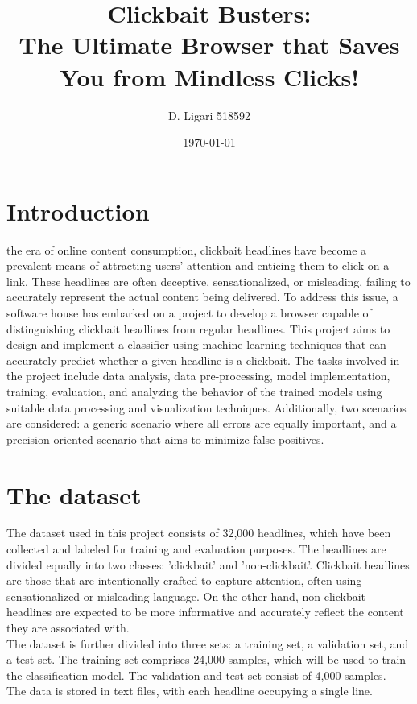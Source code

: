 \documentclass{class}
\title{Clickbait Busters:\\ The Ultimate Browser that Saves You from Mindless Clicks!}
\author[1]{D. Ligari 518592}
\affil[1]{Machine Learning course, University of Pavia, Department of Computer Engineering (Data Science), Pavia, Italy}
\date{\today}
\begin{document}
\maketitle
\thispagestyle{FirstPage}
\tableofcontents
\section{Introduction}
the era of online content consumption, clickbait headlines have become a prevalent means of attracting users' attention and enticing them to click on a link.
These headlines are often deceptive, sensationalized, or misleading, failing to accurately represent the actual content being delivered.
To address this issue, a software house has embarked on a project to develop a browser capable of distinguishing clickbait headlines from regular headlines.
This project aims to design and implement a classifier using machine learning techniques that can accurately predict whether a given headline is a clickbait.
The tasks involved in the project include data analysis, data pre-processing, model implementation, training, evaluation, and analyzing the behavior
of the trained models using suitable data processing and visualization techniques.
Additionally, two scenarios are considered: a generic scenario where all errors are equally important, and a precision-oriented scenario
that aims to minimize false positives.

\section{The dataset}
The dataset used in this project consists of 32,000 headlines, which have been collected and labeled for training and evaluation purposes.
The headlines are divided equally into two classes: 'clickbait' and 'non-clickbait'.
Clickbait headlines are those that are intentionally crafted to capture attention,
often using sensationalized or misleading language.
On the other hand, non-clickbait headlines are expected to be more informative and accurately reflect the content they are associated with.\\
The dataset is further divided into three sets: a training set, a validation set, and a test set.
The training set comprises 24,000 samples, which will be used to train the classification model. The validation and test set consist of 4,000 samples.\\
The data is stored in text files, with each headline occupying a single line.
\end{document}
